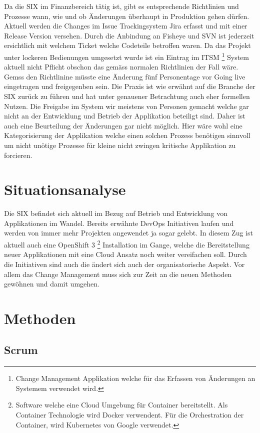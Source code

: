 Da die SIX im Finanzbereich tätig ist, gibt es entsprechende Richtlinien und Prozesse wann, wie und ob Änderungen überhaupt in Produktion gehen dürfen. Aktuell werden die Changes im Issue Trackingsystem Jira erfasst und mit einer Release Version versehen. Durch die Anbindung an Fisheye und SVN ist jederzeit ersichtlich mit welchem Ticket welche Codeteile betroffen waren. Da das Projekt unter lockeren Bedienungen umgesetzt wurde ist ein Eintrag im ITSM \footnote{Change Management Applikation welche für das Erfassen von Änderungen an Systemem verwendet wird.} System aktuell nicht Pflicht obschon das gemäss normalen Richtlinien der Fall wäre. 
Gemss den Richtlinine müsste eine Änderung fünf Personentage vor Going live eingetragen und freigegenben sein. Die Praxis ist wie erwähnt auf die Branche der SIX zurück zu führen und hat unter genauener Betrachtung auch eher formellen Nutzen. Die Freigabe im System wir meistens von Personen gemacht welche gar nicht an der Entwicklung und Betrieb der Applikation beteiligt sind. Daher ist auch eine Beurteilung der Änderungen gar nicht möglich. Hier wäre wohl eine Kategorisierung der Applikation welche einen solchen Prozess benötigen sinnvoll um nicht unötige Prozesse für kleine nicht zwingen kritische Applikation zu forcieren.

\section{Situationsanalyse}

Die SIX befindet sich aktuell im Bezug auf Betrieb und Entwicklung von Applikationen im Wandel. Bereits erwähnte DevOps Initiativen laufen und werden von immer mehr Projekten angewendet ja sogar gelebt. In diesem Zug ist aktuell auch eine OpenShift 3 \footnote{Software welche eine Cloud Umgebung für Container bereitstellt. Als Container Technologie wird Docker verwendent. Für die Orchestration der Container, wird Kubernetes von Google verwendet.} Installation im Gange, welche die Bereitstellung neuer Applikationen mit eine Cloud Ansatz noch weiter vereifachen soll.
Durch die Initiativen sind auch die ändert sich auch der organisatorische Aspekt. Vor allem das Change Management muss sich zur Zeit an die neuen Methoden gewöhnen und damit umgehen.

\section{Methoden}

\subsection{Scrum}

